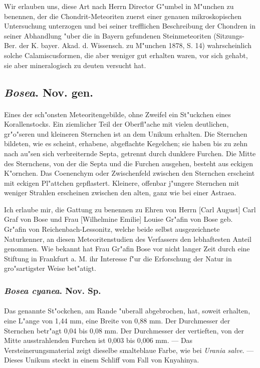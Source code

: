 \documentclass[a4paper, 11pt, oneside]{article}
\begin{document}
Wir erlauben uns, diese Art nach Herrn Director G"umbel in M"unchen zu benennen, der die Chondrit-Meteoriten zuerst einer genauen mikroskopischen Untersuchung unterzogen und bei seiner trefflichen Beschreibung der Chondren in seiner Abhandlung "uber die in Bayern gefundenen Steinmeteoriten (Sitzungs-Ber. der K. bayer. Akad. d. Wissensch. zu M"unchen 1878, S. 14) wahrscheinlich solche Calamiscusformen, die aber weniger gut erhalten waren, vor sich gehabt, sie aber mineralogisch zu deuten versucht hat.
\subsection{\emph{Bosea}. Nov. gen.}
\paragraph{}
Eines der sch"onsten Meteoritengebilde, ohne Zweifel ein St"uckchen eines Korallenstocks. Ein ziemlicher Teil der Oberfl"ache mit vielen deutlichen, gr"o"seren und kleineren Sternchen ist an dem Unikum erhalten. Die Sternchen bildeten, wie es scheint, erhabene, abgeflachte Kegelchen; sie haben bis zu zehn nach au"sen sich verbreiternde Septa, getrennt durch dunklere Furchen. Die Mitte des Sternchens, von der die Septa und die Furchen ausgehen, besteht aus eckigen K"ornchen. Das Coenenchym oder Zwischenfeld zwischen den Sternchen erscheint mit eckigen Pl"attchen gepflastert. Kleinere, offenbar j"ungere Sternchen mit weniger Strahlen erscheinen zwischen den alten, ganz wie bei einer Astraea.

Ich erlaube mir, die Gattung zu benennen zu Ehren von Herrn [Carl August] Carl Graf von Bose und Frau [Wilhelmine Emilie] Louise Gr"afin von Bose geb. Gr"afin von Reichenbach-Lessonitz, welche beide selbst ausgezeichnete Naturkenner, an diesen Meteoritenstudien des Verfassers den lebhaftesten Anteil genommen. Wie bekannt hat Frau Gr"afin Bose vor nicht langer Zeit durch eine Stiftung in Frankfurt a. M. ihr Interesse f"ur die Erforschung der Natur in gro"sartigster Weise bet"atigt.
\subsubsection{\emph{Bosea cyanea}. Nov. Sp.}
\paragraph{}
Das genannte St"ockchen, am Rande "uberall abgebrochen, hat, soweit erhalten, eine L"ange von 1,44 mm, eine Breite von 0,88 mm. Der Durchmesser der Sternchen betr"agt 0,04 bis 0,08 mm. Der Durchmesser der vertieften, von der Mitte ausstrahlenden Furchen ist 0,003 bis 0,006 mm. --- Das Versteinerungsmaterial zeigt dieselbe smalteblaue Farbe, wie bei \emph{Urania salve}. --- Dieses Unikum steckt in einem Schliff vom Fall von Knyahinya.
\clearpage
\end{document}
